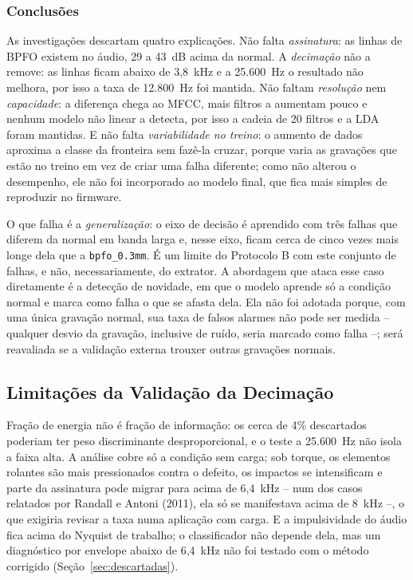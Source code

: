 \documentclass[12pt,a4paper]{article}
\begin{document}
\subsubsection{Conclusões}
\label{sec:bpfo-conclusao}

As investigações descartam quatro explicações. Não falta \emph{assinatura}: as linhas de BPFO existem no áudio, 29 a 43~dB acima da normal. A \emph{decimação} não a remove: as linhas ficam abaixo de 3,8~kHz e a 25.600~Hz o resultado não melhora, por isso a taxa de 12.800~Hz foi mantida. Não faltam \emph{resolução} nem \emph{capacidade}: a diferença chega ao MFCC, mais filtros a aumentam pouco e nenhum modelo não linear a detecta, por isso a cadeia de 20 filtros e a LDA foram mantidas. E não falta \emph{variabilidade no treino}: o aumento de dados aproxima a classe da fronteira sem fazê-la cruzar, porque varia as gravações que estão no treino em vez de criar uma falha diferente; como não alterou o desempenho, ele não foi incorporado ao modelo final, que fica mais simples de reproduzir no firmware.

O que falha é a \emph{generalização}: o eixo de decisão é aprendido com três falhas que diferem da normal em banda larga e, nesse eixo, ficam cerca de cinco vezes mais longe dela que a \texttt{bpfo\_0.3mm}. É um limite do Protocolo B com este conjunto de falhas, e não, necessariamente, do extrator. A abordagem que ataca esse caso diretamente é a detecção de novidade, em que o modelo aprende só a condição normal e marca como falha o que se afasta dela. Ela não foi adotada porque, com uma única gravação normal, sua taxa de falsos alarmes não pode ser medida -- qualquer desvio da gravação, inclusive de ruído, seria marcado como falha --; será reavaliada se a validação externa trouxer outras gravações normais.

\subsection{Limitações da Validação da Decimação}
\label{sec:dif-decimacao}

Fração de energia não é fração de informação: os cerca de 4\% descartados poderiam ter peso discriminante desproporcional, e o teste a 25.600~Hz não isola a faixa alta. A análise cobre só a condição sem carga; sob torque, os elementos rolantes são mais pressionados contra o defeito, os impactos se intensificam e parte da assinatura pode migrar para acima de 6,4~kHz -- num dos casos relatados por Randall e Antoni (2011), ela só se manifestava acima de 8~kHz --, o que exigiria revisar a taxa numa aplicação com carga. E a impulsividade do áudio fica acima do Nyquist de trabalho; o classificador não depende dela, mas um diagnóstico por envelope abaixo de 6,4~kHz não foi testado com o método corrigido (Seção~\ref{sec:descartadas}).
\end{document}
